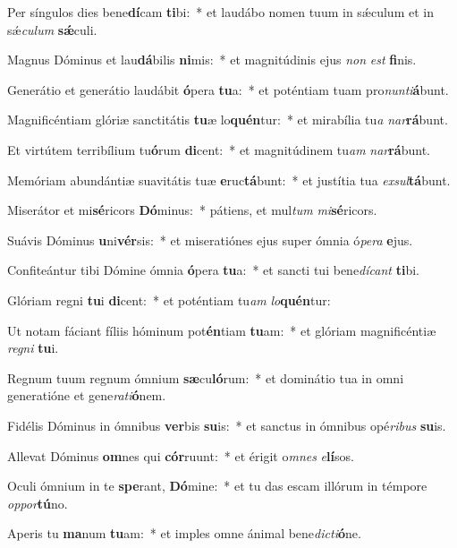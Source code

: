 \item Per síngulos dies bene\textbf{dí}cam \textbf{ti}bi:~* et laudábo nomen tuum in sǽculum et in sǽ\tinyhspace\textit{culum} \textbf{sǽ}culi.
\item Magnus Dóminus et lau\textbf{dá}bilis \textbf{ni}mis:~* et magnitúdinis ejus \textit{non} \textit{est} \textbf{fi}nis.
\item Generátio et generátio laudábit \textbf{ó}pera \textbf{tu}a:~* et poténtiam tuam pro\textit{nunti}\textbf{á}bunt.
\item Magnificéntiam glóriæ sanctitátis \textbf{tu}æ lo\textbf{quén}tur:~* et mirabília tu\tinyhspace\textit{a} \textit{nar}\textbf{rá}bunt.
\item Et virtútem terribílium tu\textbf{ó}rum \textbf{di}cent:~* et magnitúdinem tu\tinyhspace\textit{am} \textit{nar}\textbf{rá}bunt.
\item Memóriam abundántiæ suavitátis tuæ \textbf{e}ruc\textbf{tá}bunt:~* et justítia tua \textit{exsul}\textbf{tá}bunt.
\item Miserátor et mi\textbf{sé}ricors \textbf{Dó}minus:~* pátiens, et mul\textit{tum} \textit{mi}\textbf{sé}ricors.
\item Suávis Dóminus \textbf{u}ni\textbf{vér}sis:~* et miseratiónes ejus super ómnia ó\textit{pera} \textbf{e}jus.
\item Confiteántur tibi Dómine ómnia \textbf{ó}pera \textbf{tu}a:~* et sancti tui bene\tinyhspace\textit{dícant} \textbf{ti}bi.
\item Glóriam regni \textbf{tu}i \textbf{di}cent:~* et poténtiam tu\tinyhspace\textit{am} \textit{lo}\textbf{quén}tur:
\item Ut notam fáciant fíliis hóminum pot\textbf{én}tiam \textbf{tu}am:~* et glóriam magnificéntiæ \textit{regni} \textbf{tu}i.
\item Regnum tuum regnum ómnium \textbf{sæ}cu\textbf{ló}rum:~* et dominátio tua in omni generatióne et gene\textit{rati}\textbf{ó}nem.
\item Fidélis Dóminus in ómnibus \textbf{ver}bis \textbf{su}is:~* et sanctus in ómnibus opé\textit{ribus} \textbf{su}is.
\item Allevat Dóminus \textbf{om}nes qui \textbf{cór}ruunt:~* et érigit o\textit{mnes} \textit{e}\textbf{lí}sos.
\item Oculi ómnium in te \textbf{spe}rant, \textbf{Dó}mine:~* et tu das escam illórum in témpore \textit{oppor}\textbf{tú}no.
\item Aperis tu \textbf{ma}num \textbf{tu}am:~* et imples omne ánimal bene\tinyhspace\textit{dicti}\textbf{ó}ne.
